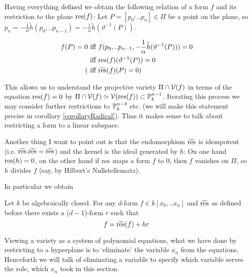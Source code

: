Having everything defined we obtain the following relation of a form $f$ and its restriction to the plane ${\operatorname{res}}(f)$: Let $P = [p_0:..p_n] \in \Pi$ be a point on the plane, so $p_n = -\frac 1\alpha \widetilde h(p_0,..p_{n-1}) = -\frac 1\alpha \widetilde h(\vartheta^{-1}(P))$.

\begin{align}
f(P) = 0
&\text{ iff } f(p_0,..p_{n-1},-\frac 1\alpha \widetilde h(\vartheta^{-1}(P))) = 0
\\
&\text { iff } {\operatorname{res}}(f)(\vartheta^{-1}(P)) = 0
\\
(&\text{ iff } \widetilde{{\operatorname{res}}}(f)(P) = 0)
\end{align}

This allows us to understand the projective variety $\Pi \cap \operatorname{\mathcal V}(f)$ in terms of the equation ${\operatorname{res}}(f) = 0$ by $\Pi \cap \operatorname{\mathcal V}(f) \simeq \operatorname{\mathcal V}({\operatorname{res}}(f)) \subset \operatorname{\mathbb P}^{n-1}_k$.
Iterating this process we may consider further restrictions to $\operatorname{\mathbb P}^{n-2}_k$ etc. (we will make this statement precise in corollary \ref{corollaryRadical}).
Thus it makes sense to talk about restricting a form to a linear subspace.

Another thing I want to point out is that the endomorphism $\widetilde{{\operatorname{res}}}$ is idempotent (i.e. $\widetilde{{\operatorname{res}}}.\widetilde{{\operatorname{res}}} = \widetilde{{\operatorname{res}}}$) and the kernel is the ideal generated by $h$: On one hand ${\operatorname{res}}(h) = 0$, on the other hand if ${\operatorname{res}}$ maps a form $f$ to $0$, then $f$ vanishes on $\Pi$, so $h$ divides $f$ (say, by Hilbert's Nullstellensatz).

In particular we obtain
\begin{proposition}
Let $k$ be algebraically closed.
For any $d$-form $f \in k[x_0,..x_n]$ and $\widetilde{{\operatorname{res}}}$ as defined before there exists a ($d-1$)-form $r$ such that
\begin{equation}
f = \widetilde{{\operatorname{res}}}(f) +  hr
\end{equation}
\end{proposition}

\begin{remark}
Viewing a variety as a system of polynomial equations, what we have done by restricting to a hyperplane is to `eliminate' the variable $x_n$ from the equations.
Henceforth we will talk of eliminating a variable to specify which variable serves the role, which $x_n$ took in this section.
\end{remark}



